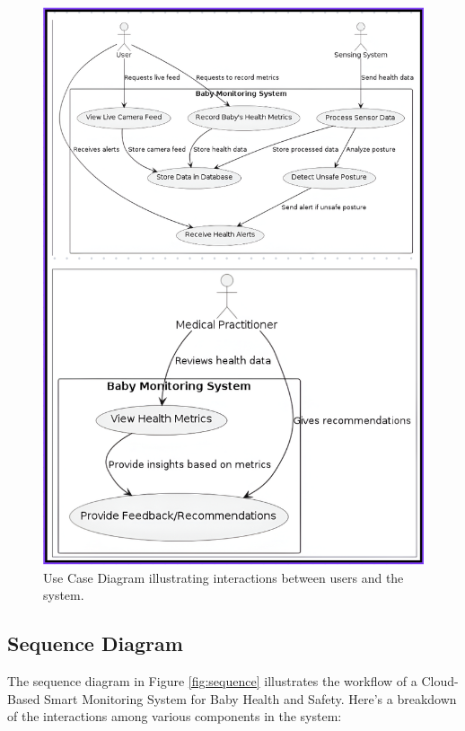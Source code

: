 \documentclass[12pt,a4paper]{report}
\begin{document}
\begin{figure}[hbtp]
  \centering
  \includegraphics[scale=0.8]{./pic/Use case.png}
  \caption{Use Case Diagram illustrating interactions between users and the system.}
  \label{fig:usecase}
\end{figure}

\subsection{Sequence Diagram}
The sequence diagram in Figure \ref{fig:sequence} illustrates the workflow of a Cloud-Based Smart Monitoring System for Baby Health and Safety. Here’s a breakdown of the interactions among various components in the system:
\end{document}
